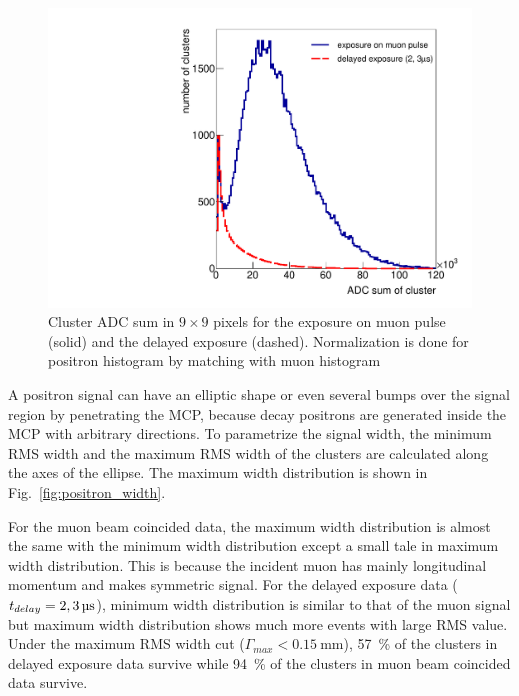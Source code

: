 \documentclass[preprint,3p,twocolumn]{elsarticle}
\begin{document}
\begin{figure}[tb]
	\begin{minipage}[t]{60mm}
		\includegraphics[width=1.30\textwidth, height=1.1\textwidth]{figure/Integ_legend_v2.pdf} %
	\end{minipage}
	\caption{Cluster ADC sum in $9\times9$ pixels for the exposure on muon pulse (solid) and the delayed exposure (dashed).
		Normalization is done for positron histogram by matching with muon histogram}
	\vspace{-0.2cm}
	\label{fig:BPM_int}
\end{figure}

A positron signal can have an elliptic shape or even several bumps over the signal region by penetrating the MCP, because decay positrons are generated inside the MCP with arbitrary directions.
To parametrize the signal width, the minimum RMS width and the maximum RMS width of the clusters are calculated along the axes of the ellipse. The maximum width distribution is shown in Fig.~\ref{fig:positron_width}.

For the muon beam coincided data, the maximum width distribution is almost the same with the minimum width distribution except a small tale in maximum width distribution. This is because the incident muon has mainly longitudinal momentum and makes symmetric signal.
For the delayed exposure data
($t_{delay} = \SIlist[list-pair-separator = {, }, list-units = single]{2; 3}{\micro\s}$),
minimum width distribution is similar to that of the muon signal but maximum width distribution shows much more events with large RMS value. Under the maximum RMS width cut
($\Gamma_{max} < \SI{0.15}{\mm}$),
\SI{57}{\percent} of the clusters in delayed exposure data survive while \SI{94}{\percent} of the clusters in muon beam coincided data survive.
\end{document}
